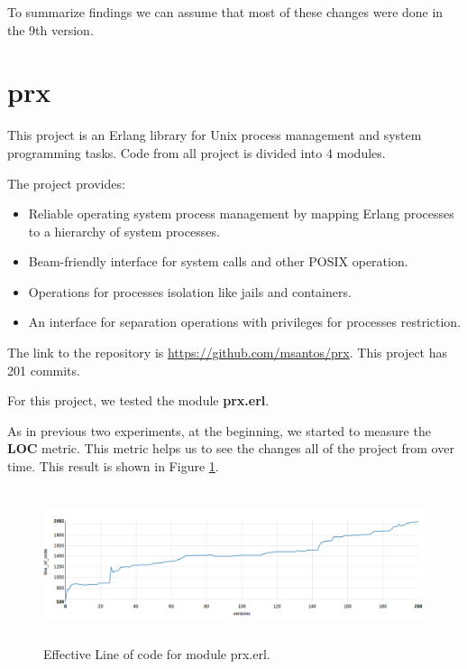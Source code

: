 To summarize findings we can assume that most of these changes were done in the 9th version.


\section{prx}

This project is an Erlang library for Unix process management and system programming tasks. Code from all project is divided into 4 modules. 

The project provides:

\begin{itemize}
	\item Reliable operating system process management by mapping Erlang processes to a hierarchy of system processes.
	\item Beam-friendly interface for system calls and other POSIX operation.
	\item Operations for processes isolation like jails and containers.
	\item An interface for separation operations with privileges for processes restriction.
\end{itemize}


The link to the repository is \url{https://github.com/msantos/prx}. This project has 201 commits. 

For this project, we tested the module \textbf{prx.erl}. 

As in previous two experiments, at the beginning, we started to measure the \textbf{LOC} metric. This metric helps us to see the changes all of the project from over time. This result is shown in Figure \ref{fig:line_of_code_prx}.

\begin{figure}[ht]
	\centering
	\includegraphics[height=45mm]{figures/line_of_code_prx.png}
	\caption{Effective Line of code for module prx.erl.}
	\label{fig:line_of_code_prx}
\end{figure}

